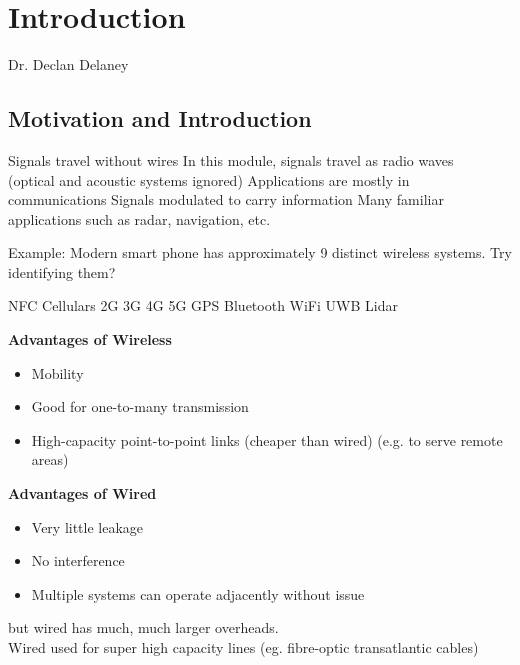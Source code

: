 \documentclass[12pt]{article}
\begin{document}
\begin{flushright}
    [Lecture 1.2]
\end{flushright}

\section{Introduction}
Dr. Declan Delaney

\subsection{Motivation and Introduction}
\begin{outline}[enumerate]
\1 Signals travel without wires
    \2 In this module, signals travel as radio waves\\
    (optical and acoustic systems ignored)
\1 Applications are mostly in communications
    \2 Signals modulated to carry information
    \2 Many familiar applications such as radar, navigation, etc.
\end{outline}

\begin{framed}
Example: Modern smart phone has approximately 9 distinct wireless systems. Try identifying them?
\begin{outline}[enumerate]
\1 NFC
\1 Cellulars
    \2 2G
    \2 3G
    \2 4G
    \2 5G
\1 GPS
\1 Bluetooth
\1 WiFi
\1 UWB
\1 Lidar
\end{outline}
\end{framed}

\textbf{Advantages of Wireless}
\begin{itemize}[noitemsep]
\item Mobility
\item Good for one-to-many transmission
\item High-capacity point-to-point links (cheaper than wired) (e.g. to serve remote areas)
\end{itemize}

\textbf{Advantages of Wired}
\begin{itemize}[noitemsep]
\item Very little leakage
\item No interference
\item Multiple systems can operate adjacently without issue
\end{itemize}
but wired has much, much larger overheads.\\
Wired used for super high capacity lines (eg. fibre-optic transatlantic cables)
\end{document}
